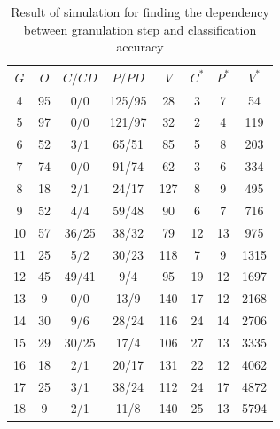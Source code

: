 \begin{table}[H]
    \caption{Result of simulation for finding the dependency between
    granulation step and classification accuracy}
    \centering
    \begin{tabular}{|c|c|c|c|c|c|c|c|}
        \hline
        $G$ & $O$ & $C/CD$ & $P/PD$ & $V$ & $C^*$ & $P^*$ & $V^*$ \\ \hline \hline
        4&95&0/0&125/95&28&3&7&54 \\ \hline
        5&97&0/0&121/97&32&2&4&119 \\\hline
        6&52&3/1&65/51&85&5&8&203 \\ \hline
        7&74&0/0&91/74&62&3&6&334 \\ \hline
        8&18&2/1&24/17&127&8&9&495 \\ \hline
        9&52&4/4&59/48&90&6&7&716 \\ \hline
        10&57&36/25&38/32&79&12&13&975 \\ \hline
        11&25&5/2&30/23&118&7&9&1315 \\ \hline
        12&45&49/41&9/4&95&19&12&1697 \\ \hline
        13&9&0/0&13/9&140&17&12&2168 \\ \hline
        14&30&9/6&28/24&116&24&14&2706 \\ \hline
        15&29&30/25&17/4&106&27&13&3335 \\ \hline
        16&18&2/1&20/17&131&22&12&4062 \\ \hline
        17&25&3/1&38/24&112&24&17&4872 \\ \hline
        18&9&2/1&11/8&140&25&13&5794 \\ \hline
    \end{tabular}
    \label{tab:simulation_research_1}
\end{table}

